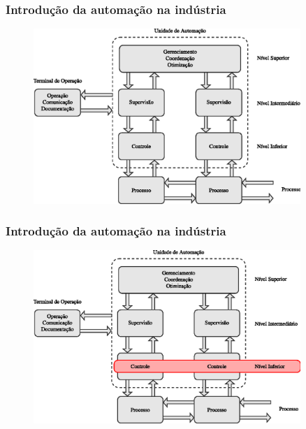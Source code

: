 \documentclass{beamer}
\begin{document}
\begin{frame}
    \frametitle{Introdução da automação na indústria}

\begin{figure}[htb]
\centering
    \includegraphics[width=0.9\textwidth]{imgs/introducao/eps/esquema_automacao}
\end{figure}
\end{frame}

\begin{frame}
    \frametitle{Introdução da automação na indústria}

\begin{figure}[htb]
\centering
    \includegraphics[width=0.9\textwidth]
    {imgs/introducao/eps/esquema_automacao_inf}
\end{figure}
\end{frame}
\end{document}

